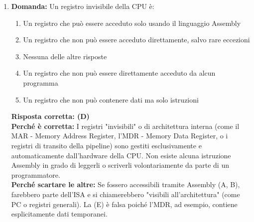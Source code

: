 \documentclass[12pt, a4paper]{article}
\begin{document}
\begin{enumerate}
    \item \textbf{Domanda:} Un registro invisibile della CPU è:
    \begin{enumerate}[label=(\Alph*)]
        \item Un registro che può essere acceduto solo usando il linguaggio Assembly
        \item Un registro che non può essere acceduto direttamente, salvo rare eccezioni
        \item Nessuna delle altre risposte
        \item Un registro che non può essere direttamente acceduto da alcun programma
        \item Un registro che non può contenere dati ma solo istruzioni
    \end{enumerate}
    \textbf{Risposta corretta: (D)} \\
    \textbf{Perché è corretta:} I registri "invisibili" o di architettura interna (come il MAR - Memory Address Register, l'MDR - Memory Data Register, o i registri di transito della pipeline) sono gestiti esclusivamente e automaticamente dall'hardware della CPU. Non esiste alcuna istruzione Assembly in grado di leggerli o scriverli volontariamente da parte di un programmatore. \\
    \textbf{Perché scartare le altre:} Se fossero accessibili tramite Assembly (A, B), farebbero parte dell'ISA e si chiamerebbero "visibili all'architettura" (come PC o registri generali). La (E) è falsa poiché l'MDR, ad esempio, contiene esplicitamente dati temporanei.


\end{enumerate}
\end{document}
